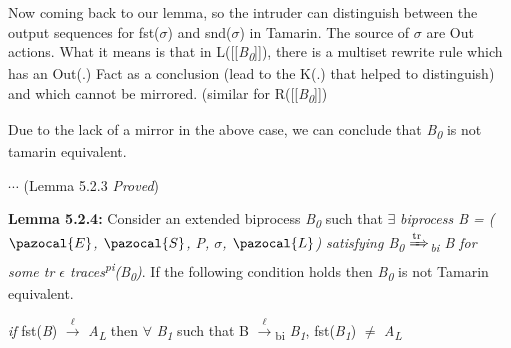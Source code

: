 \documentclass[11pt]{article}
\newcommand{\Sa}{\pazocal{S}}
\newcommand{\Lb}{\pazocal{L}}
\newcommand{\Ea}{\pazocal{E}}
\begin{document}
Now coming back to our lemma, so the intruder can distinguish between the output sequences for fst($\sigma$) and snd($\sigma$) in Tamarin. The source of $\sigma$ are Out actions. What it means is that in L([[{\it B\textsubscript{0}}]]), there is a multiset rewrite rule which has an Out(.) Fact as a conclusion (lead to the K(.) that helped to distinguish) and which cannot be mirrored. (similar for R([[{\it B\textsubscript{0}}]])\newline

Due to the lack of a mirror in the above case, we can conclude that {\it B\textsubscript{0}} is not tamarin equivalent.

\hfill \hfill $\cdots$ (Lemma 5.2.3 {\it Proved})\newline

\vspace{6pt}
{\bf Lemma 5.2.4: }Consider an extended biprocess {\it B\textsubscript{0}} such that $\exists$ {\it biprocess B = ($\Ea$, $\Sa$, P, $\sigma$, $\Lb$) satisfying B\textsubscript{0} {$\xRightarrow[\text{}]{\text{tr}}$}\textsubscript{bi} B for some tr $\epsilon$ traces\textsuperscript{pi}(B\textsubscript{0})}. If the following condition holds then {\it B\textsubscript{0}} is not Tamarin equivalent.
\begin{center}
  {\it if} fst({\it B}) {$\xrightarrow[\text{}]{\text{$\ell$}}$} {\it A}\textsubscript{{\it L}} then {$\forall$} {\it B\textsubscript{1}} such that 
  B {$\xrightarrow[\text{}]{\text{$\ell$}}$}{\textsubscript{bi}} {\it B\textsubscript{1}}, fst({\it B\textsubscript{1}}) $\neq$ {\it A}\textsubscript{{\it L}}
\end{center}
\end{document}
